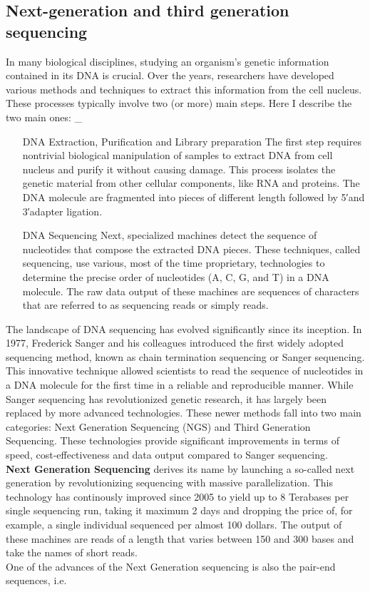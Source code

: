 \subsection{Next-generation and third generation sequencing}
In many biological disciplines, studying an organism's genetic information contained in its DNA is crucial. Over the years, researchers have developed various methods and techniques to extract this information from the cell nucleus. These processes typically involve two (or more) main steps. Here I describe the two main ones:
_{\begin{itemize}
	\item[DNA Extraction, Purification and Library preparation] The first step requires nontrivial biological manipulation of samples to extract DNA from cell nucleus and purify it without causing damage. This process isolates the genetic material from other cellular components, like RNA and proteins. The DNA molecule are fragmented into pieces of different length followed by 5′and 3′adapter ligation. 
	\item[DNA Sequencing] Next, specialized machines detect the sequence of nucleotides that compose the extracted DNA pieces. These techniques, called sequencing, use various, most of the time proprietary, technologies to determine the precise order of nucleotides (A, C, G, and T) in a DNA molecule. The raw data output of these machines are sequences of characters that are referred to as sequencing reads or simply reads.
\end{itemize}}
The landscape of DNA sequencing has evolved significantly since its inception. In 1977, Frederick Sanger and his colleagues introduced the first widely adopted sequencing method, known as chain termination sequencing or Sanger sequencing\cite{sanger_sequencing}. This innovative technique allowed scientists to read the sequence of nucleotides in a DNA molecule for the first time in a reliable and reproducible manner.
While Sanger sequencing has revolutionized genetic research, it has largely been replaced by more advanced technologies. These newer methods fall into two main categories:
Next Generation Sequencing (NGS) and Third Generation Sequencing. These technologies provide significant improvements in terms of speed, cost-effectiveness and data output compared to Sanger sequencing. \\
\textbf{Next Generation Sequencing} derives its name by launching a so-called next generation by revolutionizing sequencing with massive parallelization. This technology has continously improved since 2005 to yield up to 8 Terabases per single sequencing run, taking it maximum 2 days and dropping the price of, for example, a single individual sequenced per almost 100 dollars.
The output of these machines are reads of a length that varies between 150 and 300 bases and take the names of short reads. \\
One of the advances of the Next Generation sequencing is also the pair-end sequences, i.e. 


